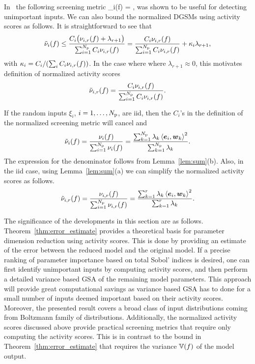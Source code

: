 In~\cite{Vohra:2018} the following screening metric
\be
   \tilde{\nu}_i(f) = ,
\label{eq:ndgsm}
\ee
was shown to be useful for detecting unimportant inputs. 
We can also bound the normalized DGSMs using activity scores as follows. It is straightforward to see  
that
\[
\tilde{\nu}_i(f) \leq 
\frac{ C_i \big(\act{f}{i}{r} + \lambda_{r+1}\big)}{\sum_{i=1}^\Np C_i \act{f}{i}{r}}
=\frac{C_i \act{f}{i}{r}}{\sum_{i=1}^\Np C_i \act{f}{i}{r}} + \kappa_i \lambda_{r+1}, 
\]
with $\kappa_i = C_i / (\sum_i C_i \act{f}{i}{r})$. 
In the case where where $\lambda_{r+1} \approx 0$, 
this motivates definition of
normalized activity scores
\[
   \actt{f}{i}{r} =  \frac{C_i \act{f}{i}{r}}{\sum_{i=1}^\Np C_i \act{f}{i}{r}}.
\] 

\begin{remark}
If the random inputs $\xi_i$, $i = 1, \ldots, \Np$, are iid, then 
the $C_i$'s in the definition of the normalized screening metric will cancel and 
\[
    \tilde{\nu}_i(f) = \frac{\nu_i(f)}{\sum_{i=1}^\Np \nu_i(f)} 
      = \frac{\sum_{k=1}^\Np \lambda_k \ip{\vec{e}_i}{\vec{w}_k}^2}{\sum_{k = 1}^\Np \lambda_k}.
\]
The expression for the denominator follows from Lemma~\ref{lem:sum}(b). 
Also, in the iid case, using Lemma~\ref{lem:sum}(a) we can simplify the normalized activity scores as follows. 
\[
   \actt{f}{i}{r} =  \frac{\act{f}{i}{r}}{\sum_{i=1}^\Np \act{f}{i}{r}} = 
                     \frac{\sum_{k=1}^r \lambda_k \ip{\vec{e}_i}{\vec{w}_k}^2}
                          {\sum_{k = 1}^r \lambda_k}.
\]
\end{remark}

The significance of the developments in this section are as follows.
Theorem~\ref{thm:error_estimate} provides a theoretical basis for parameter dimension
reduction using activity scores. This is done by providing an estimate of the
error between the reduced model and the original model. If a precise ranking of
parameter importance based on total Sobol' indices is desired, one
can first identify unimportant inputs by computing activity scores, and then
perform a detailed variance based GSA of the remaining model parameters. This approach will 
provide great computational savings as variance based GSA has to done for a small number of
inputs deemed important based on their activity scores. Moreover, the
presented result covers a broad class of input distributions coming from 
Boltzmann family of distributions.
Additionally, the normalized activity scores discussed above provide practical
screening metrics that require only computing the activity scores. This is in
contrast to the bound in Theorem~\ref{thm:error_estimate} that requires the
variance $\V(f)$ of the model output.

